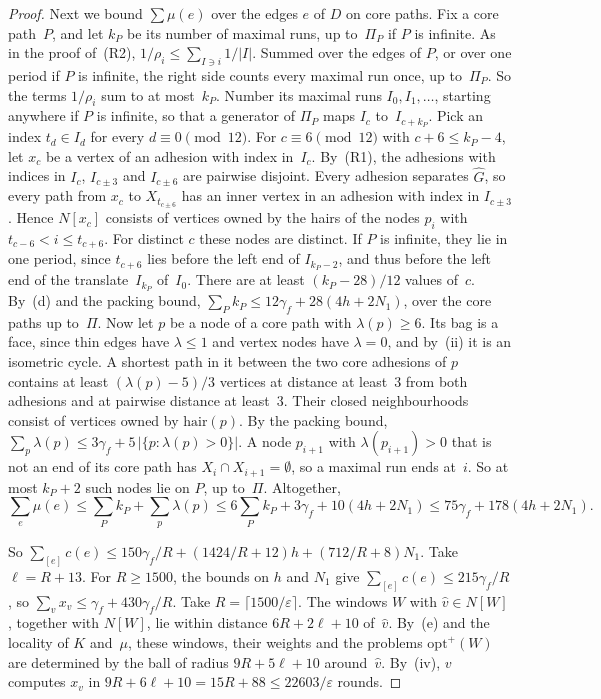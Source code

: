 \documentclass[11pt]{article}
\theoremstyle{remark}
\begin{document}
\begin{proof}
Next we bound $\sum\mu(e)$ over the edges $e$ of $D$ on core paths. Fix a core path~$P$, and let
$k_P$ be its number of maximal runs, up to~$\Pi_P$ if $P$ is infinite. As in the proof of~(R2),
$1/\rho_i\le\sum_{I\ni i}1/|I|$. Summed over the edges of $P$, or over one period if $P$ is infinite,
the right side counts every maximal run once, up to~$\Pi_P$. So the terms $1/\rho_i$ sum to at
most~$k_P$. Number its maximal runs $I_0,I_1,\dots$, starting
anywhere if $P$ is infinite, so that a generator of $\Pi_P$ maps $I_c$ to~$I_{c+k_P}$. Pick an index $t_d\in I_d$
for every $d\equiv0\pmod{12}$. For $c\equiv6\pmod{12}$ with $c+6\le k_P-4$, let $x_c$ be a vertex of an
adhesion with index in~$I_c$. By~(R1), the adhesions with indices in $I_c$, $I_{c\pm3}$ and $I_{c\pm6}$
are pairwise disjoint. Every adhesion separates $\hat G$, so every path from $x_c$ to $X_{t_{c\pm6}}$
has an inner vertex in an adhesion with index in $I_{c\pm3}$. Hence $N[x_c]$ consists of vertices
owned by the hairs of the nodes $p_i$ with $t_{c-6}<i\le t_{c+6}$. For distinct $c$ these nodes are
distinct. If $P$ is infinite, they lie in one period, since $t_{c+6}$ lies before the left end of
$I_{k_P-2}$, and thus before the left end of the translate~$I_{k_P}$ of~$I_0$. There are at least
$(k_P-28)/12$ values of~$c$. By~(d) and the packing bound, $\sum_Pk_P\le12\gamma_f+28(4h+2N_1)$, over
the core paths up to~$\Pi$. Now let $p$ be a node of a core path with $\lambda(p)\ge6$. Its bag is a
face, since thin edges have $\lambda\le1$ and vertex nodes have $\lambda=0$, and by~(ii) it is an
isometric cycle. A shortest path in it between the two core adhesions of $p$ contains at least
$(\lambda(p)-5)/3$ vertices at distance at least~$3$ from both adhesions and at pairwise distance at
least~$3$. Their closed neighbourhoods consist of vertices owned by $\mathrm{hair}(p)$. By the
packing bound, $\sum_p\lambda(p)\le3\gamma_f+5\,|\{p:\lambda(p)>0\}|$. A node $p_{i+1}$ with
$\lambda(p_{i+1})>0$ that is not an end of its core path has $X_i\cap X_{i+1}=\emptyset$, so a
maximal run ends at~$i$. So at most $k_P+2$ such nodes lie on $P$, up to~$\Pi$. Altogether,
\[
  \sum_e\mu(e)\le\sum_Pk_P+\sum_p\lambda(p)\le6\sum_Pk_P+3\gamma_f+10(4h+2N_1)
  \le75\gamma_f+178(4h+2N_1).
\]

So $\sum_{[e]}c(e)\le150\gamma_f/R+(1424/R+12)h+(712/R+8)N_1$. Take $\ell=R+13$. For $R\ge1500$, the
bounds on $h$ and $N_1$ give $\sum_{[e]}c(e)\le215\gamma_f/R$, so $\sum_vx_v\le\gamma_f+430\gamma_f/R$.
Take $R=\lceil1500/\varepsilon\rceil$. The windows $W$ with $\hat v\in N[W]$, together with
$N[W]$, lie within distance $6R+2\ell+10$ of~$\hat v$. By~(e) and the locality of $K$ and~$\mu$,
these windows, their weights and the problems $\mathrm{opt}^+(W)$ are determined by the ball of radius
$9R+5\ell+10$ around~$\hat v$. By~(iv), $v$ computes $x_v$ in $9R+6\ell+10=15R+88\le22603/\varepsilon$
rounds.


\end{proof}
\end{document}
